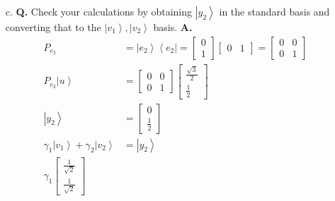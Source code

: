 \documentclass[main.tex]{subfiles}
\begin{document}
\begin{enumerate}
\begin{enumerate}
        \item[c.] \textbf{Q.} Check your calculations by obtaining $\left|y_{2}\right\rangle$ in the standard basis and converting that to the $\left|v_{1}\right\rangle,\left|v_{2}\right\rangle$ basis. \textbf{A.}
        \begin{align*}
            P_{e_2}                                                                                             & = \left|e_{2}\right\rangle \left\langle e_{2} \right| 
                                                                                                                = \left[\begin{array}{l} 0 \\ 1 \end{array}\right] \left[\begin{array}{ll} 0 & 1 \end{array}\right] 
                                                                                                                = \left[\begin{array}{ll} 0 & 0 \\ 0 & 1 \end{array}\right] \\
            P_{e_2} \left|u\right\rangle                                                                        & = \left[\begin{array}{ll} 0 & 0 \\ 0 & 1 \end{array}\right] 
                                                                                                                \left[\begin{array}{c} \frac{\sqrt{3}}{2} \\ \frac{1}{2} \end{array}\right] \\
            \left|y_{2}\right\rangle                                                                            & = \left[\begin{array}{c} 0 \\ \frac{1}{2} \end{array}\right] \\
            \gamma_{1}\left|v_{1}\right\rangle+\gamma_{2}\left|v_{2}\right\rangle                               & = \left|y_{2}\right\rangle\\
            \gamma_{1} \left[\begin{array}{l} \frac{1}{\sqrt{2}} \\ \frac{1}{\sqrt{2}} \end{array}\right]

\end{align*}
\end{enumerate}
\end{enumerate}
\end{document}
